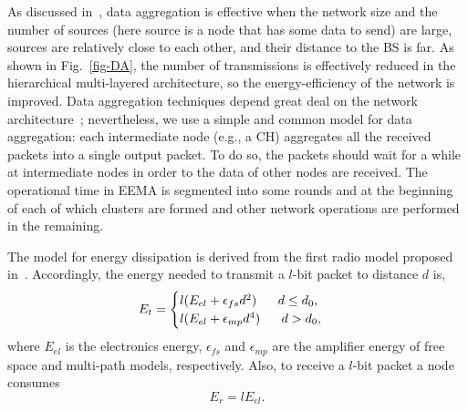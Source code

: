 \documentclass[journal]{IEEEtran}
\begin{document}
\begin{figure*}[t]
\centering
	\caption{A simple case study; a WSN with/without data aggregation.}
    \label{fig-DA}
\end{figure*}
 

As discussed in~\cite{impact}, data aggregation is effective when the network size and the number of sources (here source is a node that has some data to send) are large, sources are relatively close to each other, and their distance to the BS is far.  As shown in Fig.~\ref{fig-DA},  the number of transmissions is effectively reduced in the hierarchical multi-layered architecture, so the energy-efficiency of the network is improved.  Data aggregation techniques depend great deal on the network architecture~\cite{survey-DA}; nevertheless,  we use a simple and common model for data aggregation: each intermediate node (e.g., a CH) aggregates all the received packets into a single output packet.  To do so, the packets should wait for a while at intermediate nodes in order to the data of other nodes are received. The operational time in EEMA is segmented into some rounds and at the beginning of each of which clusters are formed and other network operations are performed in the remaining.

The model for energy dissipation is derived from the first radio model proposed in~\cite{Heinzelman2002}.  
Accordingly, the energy needed to transmit a $l$-bit packet to distance $d$ is,
\begin{equation}
\label{eq:send-energy}
E_{t}=
\begin{cases}
l(E_{el} + \epsilon_{fs}d^{2}) \;\;\;\;\;\; d \leq d_{0}, \cr
l(E_{el} + \epsilon_{mp}d^{4}) \;\;\;\;\;\; d > d_{0},
\end{cases}
\end{equation}
where $E_{el}$ is the electronics energy, $\epsilon_{fs}$  and $\epsilon_{mp}$ are the amplifier energy of free space and multi-path models, respectively.  Also, to receive a $l$-bit packet a node consumes
\begin{equation}
\label{eq:receive-energy}
E_{r}=lE_{el}.
\end{equation}
\end{document}
